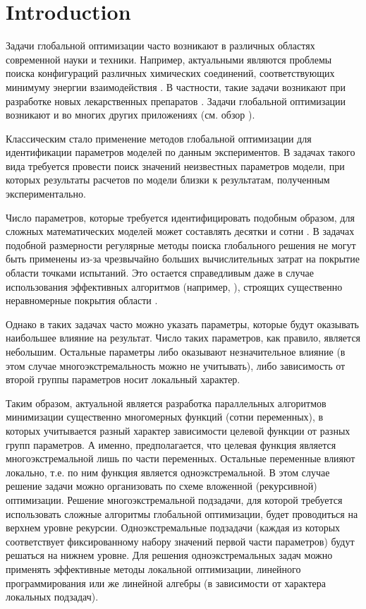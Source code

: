 \documentclass{svproc}
\begin{document}
\section{Introduction}

Задачи глобальной оптимизации часто возникают в различных областях современной науки и техники. Например,  актуальными являются проблемы поиска конфигураций различных химических соединений, соответствующих минимуму энергии взаимодействия \cite{Posypkin2014}. В частности, такие задачи возникают при разработке новых лекарственных препаратов \cite{Sulimov}. Задачи глобальной оптимизации возникают и во многих других приложениях (см. обзор  \cite{Pinter2006}). 

Классическим стало применение методов глобальной оптимизации для идентификации параметров моделей по данным экспериментов. В задачах такого вида требуется провести поиск значений неизвестных параметров модели, при которых результаты расчетов по модели  близки к результатам, полученным экспериментально.

Число параметров, которые требуется идентифицировать подобным образом, для сложных математических моделей может составлять десятки и сотни \cite{Nurislamova2016,Akhmadullina2017}. В задачах подобной размерности регулярные методы поиска глобального решения не могут быть применены из-за чрезвычайно больших вычислительных затрат на покрытие области точками испытаний. Это остается справедливым даже в случае использования эффективных алгоритмов (например, \cite{Paulavicius2011,Evtushenko2009,Jones2009}), строящих существенно неравномерные покрытия области . 

Однако в таких задачах часто можно указать параметры, которые будут оказывать наибольшее влияние на результат. Число таких параметров, как правило, является небольшим. Остальные параметры либо оказывают незначительное влияние (в этом случае многоэкстремальность можно не учитывать), либо зависимость от второй группы параметров носит локальный характер.

Таким образом, актуальной является разработка параллельных алгоритмов минимизации существенно многомерных функций (сотни переменных), в которых учитывается разный характер зависимости целевой функции от разных групп параметров. А именно, предполагается, что целевая функция является многоэкстремальной лишь по части переменных. Остальные переменные влияют локально, т.е. по ним функция является одноэкстремальной. 
В этом случае решение задачи можно организовать по схеме вложенной (рекурсивной) оптимизации. Решение  многоэкстремальной подзадачи, для которой требуется использовать сложные алгоритмы глобальной оптимизации, будет проводиться на верхнем уровне рекурсии.
Одноэкстремальные подзадачи (каждая из которых соответствует фиксированному набору значений первой части параметров) будут решаться на нижнем уровне. Для решения одноэкстремальных задач можно применять эффективные методы локальной оптимизации, линейного программирования или же линейной алгебры (в зависимости от характера локальных подзадач).
\end{document}
